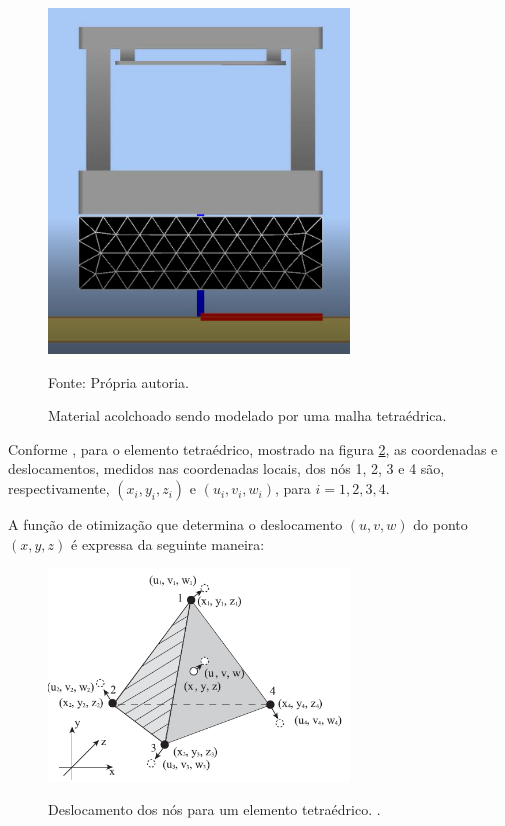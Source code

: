  \begin{figure}[H]  
        \centering
        \caption{Material acolchoado sendo modelado por uma malha tetraédrica.}
        \includegraphics[width=8cm]{./figs/MaterialDividido.PNG}
        \par\medskip
        Fonte: Própria autoria.
        \label{fig:ElementoFinito}
\end{figure}


Conforme \cite{Chen2017numerical}, para o elemento tetraédrico, mostrado na figura \ref{fig:finiteelement}, as coordenadas e deslocamentos, medidos nas coordenadas locais, dos nós 1, 2, 3 e 4 são, respectivamente, $(x_{i}, y_{i}, z_{i})$ e $(u_{i}, v_{i}, w_{i})$, para $i = {1, 2, 3, 4}$.

 A função de otimização que determina o deslocamento $(u, v, w)$ do ponto $(x, y, z)$ é expressa da seguinte maneira:
 
 
 \begin{figure}[h]  
        \centering
        \caption{Deslocamento dos nós para um elemento tetraédrico. \cite{Chen2017numerical}.}
        \includegraphics[width=8cm]{./figs/finiteelement.png}
        \label{fig:finiteelement}
\end{figure}

